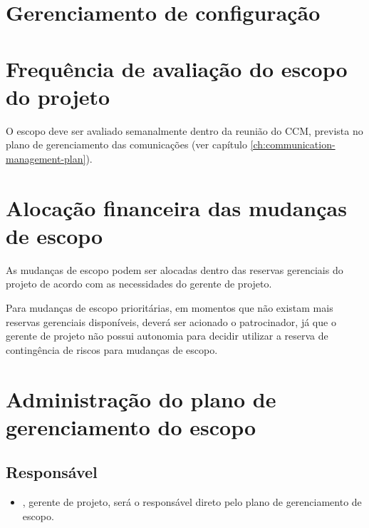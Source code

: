 
\section{Gerenciamento de configuração}


\section{Frequência de avaliação do escopo do projeto}

O escopo deve ser avaliado semanalmente dentro da reunião do CCM, prevista no plano de gerenciamento das comunicações (ver capítulo \ref{ch:communication-management-plan}).

\section{Alocação financeira das mudanças de escopo}

As mudanças de escopo podem ser alocadas dentro das reservas gerenciais do projeto de acordo com as necessidades do gerente de projeto.

Para mudanças de escopo prioritárias, em momentos que não existam mais reservas gerenciais disponíveis, deverá ser acionado o patrocinador, já que o gerente de projeto não possui autonomia para decidir utilizar a reserva de contingência de riscos para mudanças de escopo.

\section{Administração do plano de gerenciamento do escopo}

\subsection{Responsável}

\begin{itemize}
	\item \projectManagerName, gerente de projeto, será o responsável direto pelo plano de gerenciamento de escopo.
\end{itemize}

